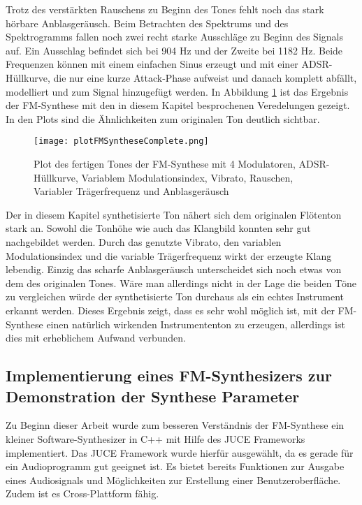 Trotz des verstärkten Rauschens zu Beginn des Tones fehlt noch das stark hörbare Anblasgeräusch. Beim Betrachten des Spektrums und des Spektrogramms fallen noch zwei recht starke Ausschläge zu Beginn des Signals auf. Ein Ausschlag befindet sich bei 904 Hz und der Zweite bei 1182 Hz. Beide Frequenzen können mit einem einfachen Sinus erzeugt und mit einer ADSR-Hüllkurve, die nur eine kurze Attack-Phase aufweist und danach komplett abfällt, modelliert und zum Signal hinzugefügt werden. In Abbildung \ref{fig:plotFMSyntheseComplete} ist das Ergebnis der FM-Synthese mit den in diesem Kapitel besprochenen Veredelungen gezeigt. In den Plots sind die Ähnlichkeiten zum originalen Ton deutlich sichtbar.

\begin{figure} [h!t!b!]
\centering
  \texttt{[image: plotFMSyntheseComplete.png]}
\caption{Plot des fertigen Tones der FM-Synthese mit 4 Modulatoren, ADSR-Hüllkurve, Variablem Modulationsindex, Vibrato, Rauschen, Variabler Trägerfrequenz und Anblasgeräusch}
\label{fig:plotFMSyntheseComplete}
\end{figure}

Der in diesem Kapitel synthetisierte Ton nähert sich dem originalen Flötenton stark an. Sowohl die Tonhöhe wie auch das Klangbild konnten sehr gut nachgebildet werden. Durch das genutzte Vibrato, den variablen Modulationsindex und die variable Trägerfrequenz wirkt der erzeugte Klang lebendig. Einzig das scharfe Anblasgeräusch unterscheidet sich noch etwas von dem des originalen Tones. Wäre man allerdings nicht in der Lage die beiden Töne zu vergleichen würde der synthetisierte Ton durchaus als ein echtes Instrument erkannt werden. Dieses Ergebnis zeigt, dass es sehr wohl möglich ist, mit der FM-Synthese einen natürlich wirkenden Instrumententon zu erzeugen, allerdings ist dies mit erheblichem Aufwand verbunden.


\FloatBarrier
\subsection{Implementierung eines FM-Synthesizers zur Demonstration der Synthese Parameter}

Zu Beginn dieser Arbeit wurde zum besseren Verständnis der FM-Synthese ein kleiner Software-Synthesizer in C++ mit Hilfe des JUCE Frameworks implementiert. Das JUCE Framework wurde hierfür ausgewählt, da es gerade für ein Audioprogramm gut geeignet ist. Es bietet bereits Funktionen zur Ausgabe eines Audiosignals und Möglichkeiten zur Erstellung einer Benutzeroberfläche. Zudem ist es Cross-Plattform fähig.

